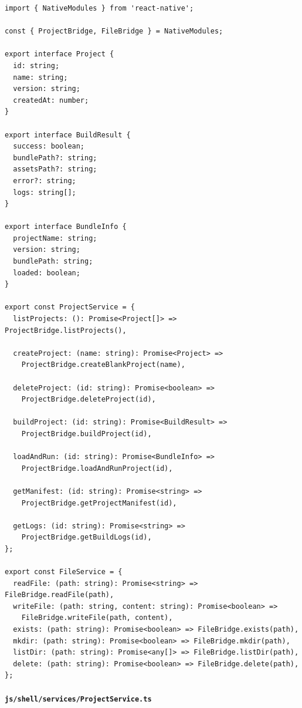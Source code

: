 \documentclass[11pt]{article}
\begin{document}
\begin{verbatim}
import { NativeModules } from 'react-native';

const { ProjectBridge, FileBridge } = NativeModules;

export interface Project {
  id: string;
  name: string;
  version: string;
  createdAt: number;
}

export interface BuildResult {
  success: boolean;
  bundlePath?: string;
  assetsPath?: string;
  error?: string;
  logs: string[];
}

export interface BundleInfo {
  projectName: string;
  version: string;
  bundlePath: string;
  loaded: boolean;
}

export const ProjectService = {
  listProjects: (): Promise<Project[]> => ProjectBridge.listProjects(),

  createProject: (name: string): Promise<Project> =>
    ProjectBridge.createBlankProject(name),

  deleteProject: (id: string): Promise<boolean> =>
    ProjectBridge.deleteProject(id),

  buildProject: (id: string): Promise<BuildResult> =>
    ProjectBridge.buildProject(id),

  loadAndRun: (id: string): Promise<BundleInfo> =>
    ProjectBridge.loadAndRunProject(id),

  getManifest: (id: string): Promise<string> =>
    ProjectBridge.getProjectManifest(id),

  getLogs: (id: string): Promise<string> =>
    ProjectBridge.getBuildLogs(id),
};

export const FileService = {
  readFile: (path: string): Promise<string> => FileBridge.readFile(path),
  writeFile: (path: string, content: string): Promise<boolean> =>
    FileBridge.writeFile(path, content),
  exists: (path: string): Promise<boolean> => FileBridge.exists(path),
  mkdir: (path: string): Promise<boolean> => FileBridge.mkdir(path),
  listDir: (path: string): Promise<any[]> => FileBridge.listDir(path),
  delete: (path: string): Promise<boolean> => FileBridge.delete(path),
};
\end{verbatim}

\paragraph{\texttt{js/shell/services/ProjectService.ts}}
\end{document}
